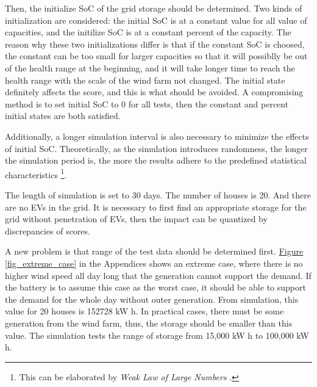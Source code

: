\documentclass[12pt,a4paper]{report}
\begin{document}
            Then, the initialize SoC of the grid storage should be determined. Two kinds of initialization are considered: the initial SoC is at a constant value for all value of capacities, and the initilize SoC is at a constant percent of the capacity. The reason why these two initializations differ is that if the constant SoC is choosed, the constant can be too small for larger capacities so that it will possiblly be out of the health range at the beginning, and it will take longer time to reach the health range with the scale of the wind farm not changed. The initial state definitely affects the score, and this is what should be avoided. A compromising method is to set initial SoC to 0 for all tests, then the constant and percent initial states are both satisfied.

            Additionally, a longer simulation interval is also necessary to minimize the effects of initial SoC. Theoretically, as the simulation introduces randomness, the longer the simulation period is, the more the results adhere to the predefined statistical characteristics \footnote{This can be elaborated by \emph{Weak Law of Large Numbers} \cite{paper:wlln}.}.

            The length of simulation is set to 30 days. The number of houses is 20. And there are no EVs in the grid. It is necessary to first find an appropriate storage for the grid without penetration of EVs, then the impact can be quantized by discrepancies of scores.

            A new problem is that range of the test data should be determined first. \hyperref[fig_extreme_case]{Figure \ref*{fig_extreme_case}} in the Appendices shows an extreme case, where there is no higher wind speed all day long that the generation cannot support the demand. If the battery is to assume this case as the worst case, it should be able to support the demand for the whole day without outer generation. From simulation, this value for 20 houses is 152728 kW h. In practical cases, there must be some generation from the wind farm, thus, the storage should be smaller than this value. The simulation tests the range of storage from 15,000 kW h to 100,000 kW h.
\end{document}
